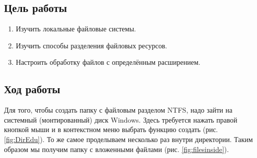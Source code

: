 \subsection{Цель работы}
\begin{enumerate}
    \item Изучить локальные файловые системы.
    \item Изучить способы разделения файловых ресурсов.
    \item Настроить обработку файлов с определённым расширением.
\end{enumerate}

\subsection{Ход работы}

Для того, чтобы создать папку с файловым разделом NTFS, надо зайти на системный (монтированный) диск Windows. Здесь требуется нажать правой кнопкой мыши и в контекстном меню выбрать функцию создать (рис. \ref{fig:DirEdu}). То же самое проделываем несколько раз внутри директории. Таким образом мы получим папку с вложенными файлами (рис. \ref{fig:filesinside}).
